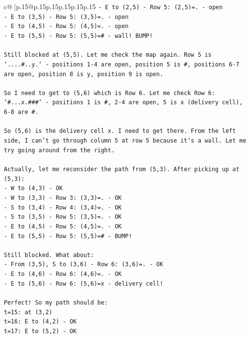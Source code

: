 \documentclass{article}
\begin{document}
{\begin{supertabular}{c@{$\;$}|p{.15\linewidth}@{}p{.15\linewidth}p{.15\linewidth}p{.15\linewidth}p{.15\linewidth}p{.15\linewidth}}
{{{\texttt{{-} E to (2,5) {-} Row 5: (2,5)=. {-} open} \\
\texttt{{-} E to (3,5) {-} Row 5: (3,5)=. {-} open} \\
\texttt{{-} E to (4,5) {-} Row 5: (4,5)=. {-} open} \\
\texttt{{-} E to (5,5) {-} Row 5: (5,5)=\# {-} wall! BUMP!} \\
\\ 
\texttt{Still blocked at (5,5). Let me check the map again. Row 5 is `....\#..y.` {-} positions 1{-}4 are open, position 5 is \#, positions 6{-}7 are open, position 8 is y, position 9 is open.} \\
\\ 
\texttt{So I need to get to (5,6) which is Row 6. Let me check Row 6: `\#...x.\#\#\#` {-} positions 1 is \#, 2{-}4 are open, 5 is x (delivery cell), 6{-}8 are \#.} \\
\\ 
\texttt{So (5,6) is the delivery cell x. I need to get there. From the left side, I can't go through column 5 at row 5 because it's a wall. Let me try going around from the right.} \\
\\ 
\texttt{Actually, let me reconsider the path from (5,3). After picking up at (5,3):} \\
\texttt{{-} W to (4,3) {-} OK} \\
\texttt{{-} W to (3,3) {-} Row 3: (3,3)=. {-} OK} \\
\texttt{{-} S to (3,4) {-} Row 4: (3,4)=. {-} OK} \\
\texttt{{-} S to (3,5) {-} Row 5: (3,5)=. {-} OK} \\
\texttt{{-} E to (4,5) {-} Row 5: (4,5)=. {-} OK} \\
\texttt{{-} E to (5,5) {-} Row 5: (5,5)=\# {-} BUMP!} \\
\\ 
\texttt{Still blocked. What about:} \\
\texttt{{-} From (3,5), S to (3,6) {-} Row 6: (3,6)=. {-} OK} \\
\texttt{{-} E to (4,6) {-} Row 6: (4,6)=. {-} OK} \\
\texttt{{-} E to (5,6) {-} Row 6: (5,6)=x {-} delivery cell!} \\
\\ 
\texttt{Perfect! So my path should be:} \\
\texttt{t=15: at (3,2)} \\
\texttt{t=16: E to (4,2) {-} OK} \\
\texttt{t=17: E to (5,2) {-} OK} \\
}}}
\end{supertabular}}
\end{document}
